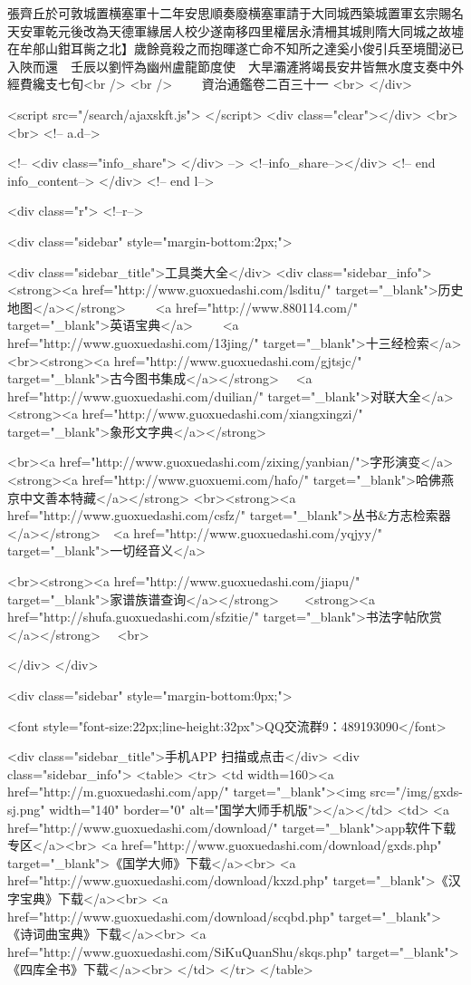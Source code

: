 張齊丘於可敦城置横塞軍十二年安思順奏廢横塞軍請于大同城西築城置軍玄宗賜名天安軍乾元後改為天德軍緣居人校少遂南移四里權居永清柵其城則隋大同城之故墟在牟郍山鉗耳胔之北】歲餘竟殺之而抱暉遂亡命不知所之達奚小俊引兵至境聞泌已入陜而還　壬辰以劉怦為幽州盧龍節度使　大旱灞滻將竭長安井皆無水度支奏中外經費纔支七旬<br />
<br />
　　資治通鑑卷二百三十一  <br>
   </div> 

<script src="/search/ajaxskft.js"> </script>
 <div class="clear"></div>
<br>
<br>
 <!-- a.d-->

 <!--
<div class="info_share">
</div> 
-->
 <!--info_share--></div>   <!-- end info_content-->
  </div> <!-- end l-->

<div class="r">   <!--r-->



<div class="sidebar"  style="margin-bottom:2px;">

 
<div class="sidebar_title">工具类大全</div>
<div class="sidebar_info">
<strong><a href="http://www.guoxuedashi.com/lsditu/" target="_blank">历史地图</a></strong>　　
<a href="http://www.880114.com/" target="_blank">英语宝典</a>　　
<a href="http://www.guoxuedashi.com/13jing/" target="_blank">十三经检索</a>　
<br><strong><a href="http://www.guoxuedashi.com/gjtsjc/" target="_blank">古今图书集成</a></strong>　
<a href="http://www.guoxuedashi.com/duilian/" target="_blank">对联大全</a>　<strong><a href="http://www.guoxuedashi.com/xiangxingzi/" target="_blank">象形文字典</a></strong>　

<br><a href="http://www.guoxuedashi.com/zixing/yanbian/">字形演变</a>　　<strong><a href="http://www.guoxuemi.com/hafo/" target="_blank">哈佛燕京中文善本特藏</a></strong>
<br><strong><a href="http://www.guoxuedashi.com/csfz/" target="_blank">丛书&方志检索器</a></strong>　<a href="http://www.guoxuedashi.com/yqjyy/" target="_blank">一切经音义</a>　　

<br><strong><a href="http://www.guoxuedashi.com/jiapu/" target="_blank">家谱族谱查询</a></strong>　　<strong><a href="http://shufa.guoxuedashi.com/sfzitie/" target="_blank">书法字帖欣赏</a></strong>　
<br>

</div>
</div>


<div class="sidebar" style="margin-bottom:0px;">

<font style="font-size:22px;line-height:32px">QQ交流群9：489193090</font>


<div class="sidebar_title">手机APP 扫描或点击</div>
<div class="sidebar_info">
<table>
<tr>
	<td width=160><a href="http://m.guoxuedashi.com/app/" target="_blank"><img src="/img/gxds-sj.png" width="140"  border="0" alt="国学大师手机版"></a></td>
	<td>
<a href="http://www.guoxuedashi.com/download/" target="_blank">app软件下载专区</a><br>
<a href="http://www.guoxuedashi.com/download/gxds.php" target="_blank">《国学大师》下载</a><br>
<a href="http://www.guoxuedashi.com/download/kxzd.php" target="_blank">《汉字宝典》下载</a><br>
<a href="http://www.guoxuedashi.com/download/scqbd.php" target="_blank">《诗词曲宝典》下载</a><br>
<a href="http://www.guoxuedashi.com/SiKuQuanShu/skqs.php" target="_blank">《四库全书》下载</a><br>
</td>
</tr>
</table>

